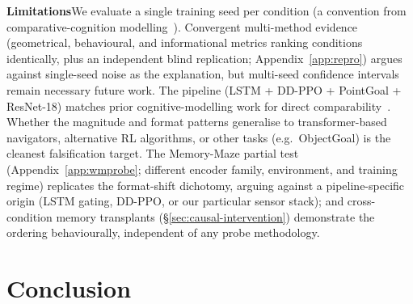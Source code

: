 \documentclass{article}
\begin{document}
\noindent\textbf{Limitations}\quad We evaluate a single training seed per condition (a convention from comparative-cognition modelling~\citep{wijmans2023emergence,banino2018grid,cueva2018grid,schaeffer2023grid}). Convergent multi-method evidence (geometrical, behavioural, and informational metrics ranking conditions identically, plus an independent blind replication; Appendix~\ref{app:repro}) argues against single-seed noise as the explanation, but multi-seed confidence intervals remain necessary future work. The pipeline (LSTM + DD-PPO + PointGoal + ResNet-18) matches prior cognitive-modelling work for direct comparability~\citep{wijmans2023emergence,banino2018grid,cueva2018grid}. Whether the magnitude and format patterns generalise to transformer-based navigators, alternative RL algorithms, or other tasks (e.g.\ ObjectGoal) is the cleanest falsification target. The Memory-Maze partial test (Appendix~\ref{app:wmprobe}; different encoder family, environment, and training regime) replicates the format-shift dichotomy, arguing against a pipeline-specific origin (LSTM gating, DD-PPO, or our particular sensor stack); and cross-condition memory transplants (§\ref{sec:causal-intervention}) demonstrate the ordering behaviourally, independent of any probe methodology.

\section{Conclusion}
\label{sec:conclusion}
\end{document}
